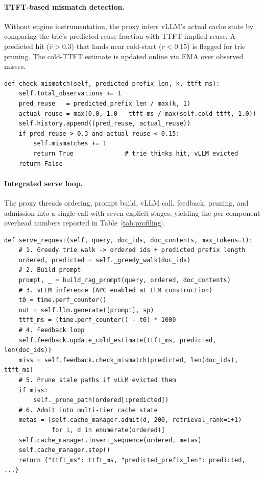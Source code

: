 \documentclass{article}
\begin{document}
\paragraph{TTFT-based mismatch detection.} Without engine instrumentation, the proxy infers vLLM's actual cache state by comparing the trie's predicted reuse fraction with TTFT-implied reuse. A predicted hit ($\hat{r}>0.3$) that lands near cold-start ($r<0.15$) is flagged for trie pruning. The cold-TTFT estimate is updated online via EMA over observed misses.

\begin{lstlisting}[caption={Cache-state feedback (\texttt{serving.py}).},label={lst:feedback}]
def check_mismatch(self, predicted_prefix_len, k, ttft_ms):
    self.total_observations += 1
    pred_reuse   = predicted_prefix_len / max(k, 1)
    actual_reuse = max(0.0, 1.0 - ttft_ms / max(self.cold_ttft, 1.0))
    self.history.append((pred_reuse, actual_reuse))
    if pred_reuse > 0.3 and actual_reuse < 0.15:
        self.mismatches += 1
        return True              # trie thinks hit, vLLM evicted
    return False
\end{lstlisting}

\paragraph{Integrated serve loop.} The proxy threads ordering, prompt build, vLLM call, feedback, pruning, and admission into a single call with seven explicit stages, yielding the per-component overhead numbers reported in Table~\ref{tab:profiling}.

\begin{lstlisting}[caption={\texttt{VLLMCacheProxy.serve\_request} (abridged).},label={lst:serve}]
def serve_request(self, query, doc_ids, doc_contents, max_tokens=1):
    # 1. Greedy trie walk -> ordered ids + predicted prefix length
    ordered, predicted = self._greedy_walk(doc_ids)
    # 2. Build prompt
    prompt, _ = build_rag_prompt(query, ordered, doc_contents)
    # 3. vLLM inference (APC enabled at LLM construction)
    t0 = time.perf_counter()
    out = self.llm.generate([prompt], sp)
    ttft_ms = (time.perf_counter() - t0) * 1000
    # 4. Feedback loop
    self.feedback.update_cold_estimate(ttft_ms, predicted, len(doc_ids))
    miss = self.feedback.check_mismatch(predicted, len(doc_ids), ttft_ms)
    # 5. Prune stale paths if vLLM evicted them
    if miss:
        self._prune_path(ordered[:predicted])
    # 6. Admit into multi-tier cache state
    metas = [self.cache_manager.admit(d, 200, retrieval_rank=i+1)
             for i, d in enumerate(ordered)]
    self.cache_manager.insert_sequence(ordered, metas)
    self.cache_manager.step()
    return {"ttft_ms": ttft_ms, "predicted_prefix_len": predicted, ...}
\end{lstlisting}
\end{document}
